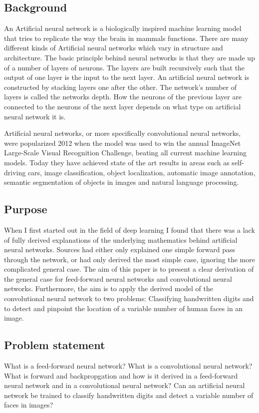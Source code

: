 \documentclass[a4paper, twoside]{article}
\begin{document}
\subsection{Background}

An Artificial neural network is a biologically inspired machine learning model that tries to replicate the way the brain in mammals functions. There are many different kinds of Artificial neural networks which vary in structure and architecture. The basic principle behind neural networks is that they are made up of a number of layers of neurons. The layers are built recursively such that the output of one layer is the input to the next layer. An artificial neural network is constructed by stacking layers one after the other. The network's number of layers is called the networks depth. How the neurons of the previous layer are connected to the neurons of the next layer depends on what type on artificial neural network it is.
\cite{cs231n}

Artificial neural networks, or more specifically convolutional neural networks, were popularized 2012 when the model was used to win the annual ImageNet Large-Scale Visual Recognition Challenge, beating all current machine learning models. Today they have achieved state of the art results in areas such as self-driving cars, image classification, object localization, automatic image annotation, semantic segmentation of objects in images and natural language processing. 
\cite{cs231n}

\subsection{Purpose}
When I first started out in the field of deep learning I found that there was a lack of fully derived explanations of the underlying mathematics behind artificial neural networks. Sources had either only explained one simple forward pass through the network, or had only derived the most simple case, ignoring the more complicated general case. The aim of this paper is to present a clear derivation of the general case for feed-forward neural networks and convolutional neural networks. Furthermore, the aim is to apply the derived model of the convolutional neural network to two problems: Classifying handwritten digits and to detect and pinpoint the location of a variable number of human faces in an image.

\subsection{Problem statement}
What is a feed-forward neural network? What is a convolutional neural network?
What is forward and backpropgation and how is it derived in a feed-forward neural network and in a convolutional neural network?
Can an artificial neural network be trained to classify handwritten digits and detect a variable number of faces in images?
\end{document}
